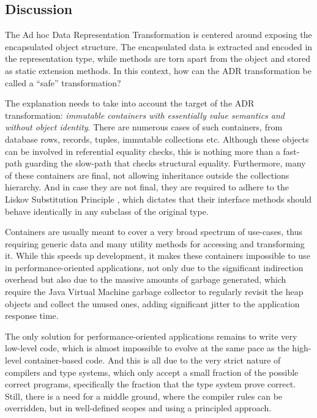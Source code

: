\subsection{Discussion}
\label{sec:ildl:discussion}
The Ad hoc Data Representation Transformation is centered around exposing the encapsulated object structure. The encapsulated data is extracted and encoded in the representation type, while methods are torn apart from the object and stored as static extension methods. In this context, how can the ADR transformation be called a ``safe'' transformation?

The explanation needs to take into account the target of the ADR transformation: \emph{immutable containers with essentially value semantics and without object identity}. There are numerous cases of such containers, from database rows, records, tuples, immutable collections etc. Although these objects can be involved in referential equality checks, this is nothing more than a fast-path guarding the slow-path that checks structural equality. Furthermore, many of these containers are final, not allowing inheritance outside the collections hierarchy. And in case they are not final, they are required to adhere to the Liskov Substitution Principle \cite{liskov-substitution-principle}, which dictates that their interface methods should behave identically in any subclass of the original type.

Containers are usually meant to cover a very broad spectrum of use-cases, thus requiring generic data and many utility methods for accessing and transforming it. While this speeds up development, it makes these containers impossible to use in performance-oriented applications, not only due to the significant indirection overhead but also due to the massive amounts of garbage generated, which require the Java Virtual Machine garbage collector to regularly revisit the heap objects and collect the unused ones, adding significant jitter to the application response time.

The only solution for performance-oriented applications remains to write very low-level code, which is almost impossible to evolve at the same pace as the high-level container-based code. And this is all due to the very strict nature of compilers and type systems, which only accept a small fraction of the possible correct programs, specifically the fraction that the type system prove correct. Still, there is a need for a middle ground, where the compiler rules can be overridden, but in well-defined scopes and using a principled approach. %

